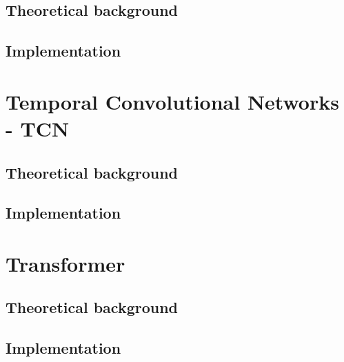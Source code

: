 \subsection{Theoretical background}

\subsection{Implementation}

\section{Temporal Convolutional Networks - TCN}

\subsection{Theoretical background}

\subsection{Implementation}

\section{Transformer}

\subsection{Theoretical background}

\subsection{Implementation}